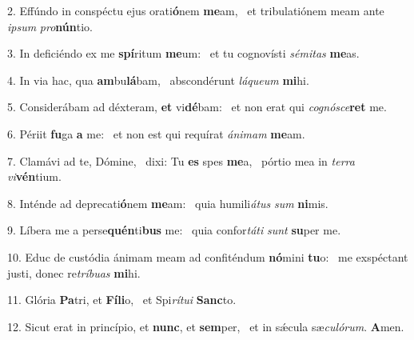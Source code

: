 2. Effúndo in conspéctu ejus orati\textbf{ó}nem \textbf{me}am, \ast\  et tribulatiónem meam ante \textit{ip}\textit{sum} \textit{pro}\textbf{nún}tio.\

3. In deficiéndo ex me \textbf{spí}ritum \textbf{me}um: \ast\  et tu cognovísti \textit{sé}\textit{mi}\textit{tas} \textbf{me}as.\

4. In via hac, qua \textbf{am}bu\textbf{lá}bam, \ast\  abscondérunt \textit{lá}\textit{que}\textit{um} \textbf{mi}hi.\

5. Considerábam ad déxteram, \textbf{et} vi\textbf{dé}bam: \ast\  et non erat qui \textit{co}\textit{gnó}\textit{sce}\textbf{ret} me.\

6. Périit \textbf{fu}ga \textbf{a} me: \ast\  et non est qui requírat \textit{á}\textit{ni}\textit{mam} \textbf{me}am.\

7. Clamávi ad te, Dómine, \dag\  dixi: Tu \textbf{es} spes \textbf{me}a, \ast\  pórtio mea in \textit{ter}\textit{ra} \textit{vi}\textbf{vén}tium.\

8. Inténde ad deprecati\textbf{ó}nem \textbf{me}am: \ast\  quia humili\textit{á}\textit{tus} \textit{sum} \textbf{ni}mis.\

9. Líbera me a perse\textbf{quén}ti\textbf{bus} me: \ast\  quia confor\textit{tá}\textit{ti} \textit{sunt} \textbf{su}per me.\

10. Educ de custódia ánimam meam ad confiténdum \textbf{nó}mini \textbf{tu}o: \ast\  me exspéctant justi, donec re\textit{trí}\textit{bu}\textit{as} \textbf{mi}hi.\

11. Glória \textbf{Pa}tri, et \textbf{Fí}\textbf{li}o, \ast\  et Spi\textit{rí}\textit{tu}\textit{i} \textbf{Sanc}to.\

12. Sicut erat in princípio, et \textbf{nunc}, et \textbf{sem}per, \ast\  et in sǽcula sæ\textit{cu}\textit{ló}\textit{rum}. \textbf{A}men.\

